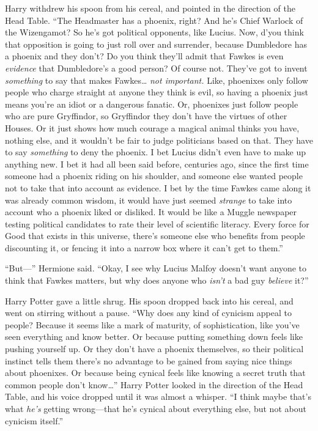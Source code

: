 Harry withdrew his spoon from his cereal, and pointed in the direction
of the Head Table. ``The Headmaster has a phoenix, right? And he's Chief
Warlock of the Wizengamot? So he's got political opponents, like Lucius.
Now, d'you think that opposition is going to just roll over and
surrender, because Dumbledore has a phoenix and they don't? Do you think
they'll admit that Fawkes is even \emph{evidence} that Dumbledore's a
good person? Of course not. They've got to invent \emph{something} to
say that makes Fawkes\ldots{} \emph{not important.} Like, phoenixes only
follow people who charge straight at anyone they think is evil, so
having a phoenix just means you're an idiot or a dangerous fanatic. Or,
phoenixes just follow people who are pure Gryffindor, so Gryffindor they
don't have the virtues of other Houses. Or it just shows how much
courage a magical animal thinks you have, nothing else, and it wouldn't
be fair to judge politicians based on that. They have to say
\emph{something} to deny the phoenix. I bet Lucius didn't even have to
make up anything new. I bet it had all been said before, centuries ago,
since the first time someone had a phoenix riding on his shoulder, and
someone else wanted people not to take that into account as evidence. I
bet by the time Fawkes came along it was already common wisdom, it would
have just seemed \emph{strange} to take into account who a phoenix liked
or disliked. It would be like a Muggle newspaper testing political
candidates to rate their level of scientific literacy. Every force for
Good that exists in this universe, there's someone else who benefits
from people discounting it, or fencing it into a narrow box where it
can't get to them.''

``But---'' Hermione said. ``Okay, I see why Lucius Malfoy doesn't want
anyone to think that Fawkes matters, but why does anyone who
\emph{isn't} a bad guy \emph{believe} it?''

Harry Potter gave a little shrug. His spoon dropped back into his
cereal, and went on stirring without a pause. ``Why does any kind of
cynicism appeal to people? Because it seems like a mark of maturity, of
sophistication, like you've seen everything and know better. Or because
putting something down feels like pushing yourself up. Or they don't
have a phoenix themselves, so their political instinct tells them
there's no advantage to be gained from saying nice things about
phoenixes. Or because being cynical feels like knowing a secret truth
that common people don't know\ldots{}'' Harry Potter looked in the
direction of the Head Table, and his voice dropped until it was almost a
whisper. ``I think maybe that's what \emph{he's} getting wrong---that
he's cynical about everything else, but not about cynicism itself.''

